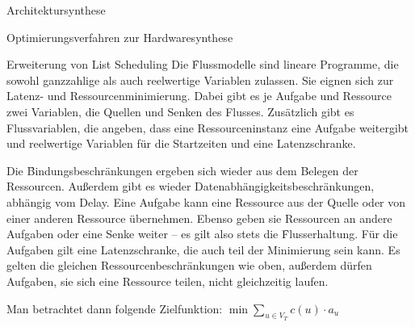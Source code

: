 \begin{chapter}{Architektursynthese}
\begin{section}{Optimierungsverfahren zur Hardwaresynthese}
\begin{subsection}{Erweiterung von List Scheduling}
  Die \f{Flussmodelle} sind lineare Programme, die sowohl ganzzahlige als auch reelwertige Variablen zulassen. Sie eignen sich zur Latenz- und Ressourcenminimierung. Dabei gibt es je Aufgabe und Ressource zwei Variablen, die Quellen und Senken des Flusses. Zusätzlich gibt es Flussvariablen, die angeben, dass eine Ressourceninstanz eine Aufgabe weitergibt und reelwertige Variablen für die Startzeiten und eine Latenzschranke.
  
  Die \f{Bindungsbeschränkungen} ergeben sich wieder aus dem Belegen der Ressourcen. Außerdem gibt es wieder Datenabhängigkeitsbeschränkungen, abhängig vom Delay. Eine Aufgabe kann eine Ressource aus der Quelle oder von einer anderen Ressource übernehmen. Ebenso geben sie Ressourcen an andere Aufgaben oder eine Senke weiter -- es gilt also stets die \f{Flusserhaltung}. Für die Aufgaben gilt eine Latenzschranke, die auch teil der Minimierung sein kann. Es gelten die gleichen Ressourcenbeschränkungen wie oben, außerdem dürfen Aufgaben, sie sich eine Ressource teilen, nicht gleichzeitig laufen. 
  
  Man betrachtet dann folgende Zielfunktion: $\min \sum_{u\in V_T} c(u)\cdot a_u$
 \end{subsection}
\end{section}
\end{chapter}
